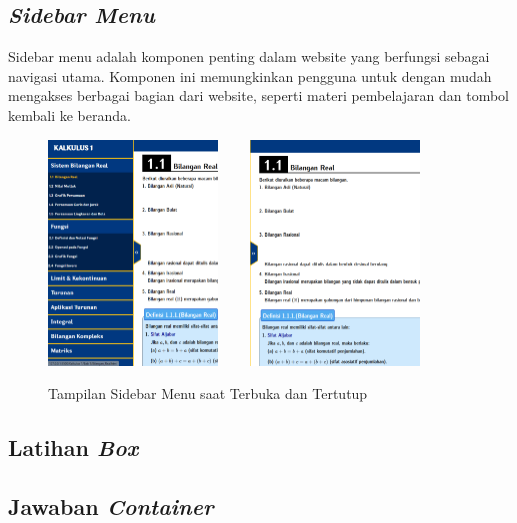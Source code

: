 \documentclass{file/KP-ITS}
\theoremstyle{definition}
\theoremstyle{definition}
\theoremstyle{plain}
\begin{document}
\subsection{\textit{Sidebar Menu}}
Sidebar menu adalah komponen penting dalam website yang berfungsi sebagai navigasi utama. Komponen ini memungkinkan pengguna untuk dengan mudah mengakses berbagai bagian dari website, seperti materi pembelajaran dan tombol kembali ke beranda. 
\begin{figure}[h!]
    \centering
    \includegraphics[width=0.4\textwidth]{foto/SidebarBuka.png}$\qquad$
    \includegraphics[width=0.4\textwidth]{foto/SidebarTutup.png}
    \caption{Tampilan Sidebar Menu saat Terbuka dan Tertutup}
\end{figure}

\subsection{Latihan \textit{Box}}

\subsection{Jawaban \textit{Container}}
\end{document}

